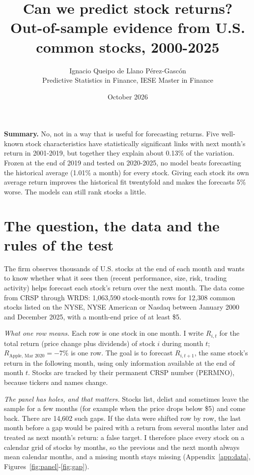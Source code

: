 \documentclass[10pt,a4paper]{article}
\title{\vspace{-1.2cm}\textbf{Can we predict stock returns?}\\[2pt]
\large Out-of-sample evidence from U.S. common stocks, 2000-2025}
\author{Ignacio Queipo de Llano P\'erez-Gasc\'on\\\small Predictive Statistics in Finance, IESE Master in Finance}
\date{October 2026}
\begin{document}
\maketitle
\vspace{-0.6cm}

\begin{tcolorbox}[colback=white,colframe=black,boxrule=0.4pt,sharp corners,left=6pt,right=6pt,top=4pt,bottom=4pt]
\textbf{Summary.} No, not in a way that is useful for forecasting returns. Five well-known
stock characteristics have statistically significant links with next month's return in 2001-2019, but together
they explain about 0.13\% of the variation. Frozen at the end of 2019 and tested on 2020-2025, no model beats
forecasting the historical average (1.01\% a month) for every stock. Giving each stock its own average return
improves the historical fit twentyfold and makes the forecasts 5\% worse. The models can still rank stocks a little.
\end{tcolorbox}

\section{The question, the data and the rules of the test}

The firm observes thousands of U.S. stocks at the end of each month and wants to know whether what it sees then
(recent performance, size, risk, trading activity) helps forecast each stock's return over the next month. The data
come from CRSP through WRDS: 1,063,590 stock-month rows for 12,308 common stocks listed on the NYSE, NYSE American or
Nasdaq between January 2000 and December 2025, with a month-end price of at least \$5.

\textit{What one row means.} Each row is one stock in one month. I write $R_{i,t}$ for the total return
(price change plus dividends) of stock $i$ during month $t$; $R_{\text{Apple, Mar 2020}}=-7\%$ is one row. The goal
is to forecast $R_{i,t+1}$, the same stock's return in the following month, using only information available at the
end of month $t$. Stocks are tracked by their permanent CRSP number (PERMNO), because tickers and names change.

\textit{The panel has holes, and that matters.} Stocks list, delist and sometimes leave the sample for a few months
(for example when the price drops below \$5) and come back. There are 14,602 such gaps. If the data were shifted
row by row, the last month before a gap would be paired with a return from several months later and treated as
next month's return: a false target. I therefore place every stock on a calendar grid of stocks by months, so
the previous and the next month always mean calendar months, and a missing month stays missing
(Appendix~\ref{app:data}, Figures~\ref{fig:panel}-\ref{fig:gap}).
\end{document}
